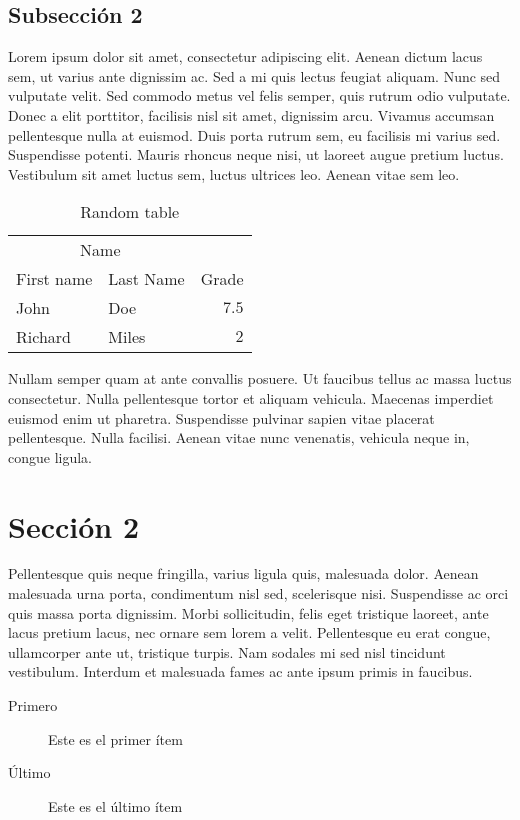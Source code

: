 \documentclass[DIV=calc,paper=a4,fontsize=11pt,twocolumn]{scrartcl} %
\begin{document}
\subsection*{Subsección 2}
Lorem ipsum dolor sit amet, consectetur adipiscing elit. Aenean dictum lacus sem, ut varius ante dignissim ac. Sed a mi quis lectus feugiat aliquam. Nunc sed vulputate velit. Sed commodo metus vel felis semper, quis rutrum odio vulputate. Donec a elit porttitor, facilisis nisl sit amet, dignissim arcu. Vivamus accumsan pellentesque nulla at euismod. Duis porta rutrum sem, eu facilisis mi varius sed. Suspendisse potenti. Mauris rhoncus neque nisi, ut laoreet augue pretium luctus. Vestibulum sit amet luctus sem, luctus ultrices leo. Aenean vitae sem leo.


\begin{table}
\caption{Random table}
\centering
\begin{tabular}{llr}
\toprule
\multicolumn{2}{c}{Name} \\
\cmidrule(r){1-2}
First name & Last Name & Grade \\
\midrule
John & Doe & $7.5$ \\
Richard & Miles & $2$ \\
\bottomrule
\end{tabular}
\end{table}

Nullam semper quam at ante convallis posuere. Ut faucibus tellus ac massa luctus consectetur. Nulla pellentesque tortor et aliquam vehicula. Maecenas imperdiet euismod enim ut pharetra. Suspendisse pulvinar sapien vitae placerat pellentesque. Nulla facilisi. Aenean vitae nunc venenatis, vehicula neque in, congue ligula.

\section*{Sección 2}
Pellentesque quis neque fringilla, varius ligula quis, malesuada dolor. Aenean malesuada urna porta, condimentum nisl sed, scelerisque nisi. Suspendisse ac orci quis massa porta dignissim. Morbi sollicitudin, felis eget tristique laoreet, ante lacus pretium lacus, nec ornare sem lorem a velit. Pellentesque eu erat congue, ullamcorper ante ut, tristique turpis. Nam sodales mi sed nisl tincidunt vestibulum. Interdum et malesuada fames ac ante ipsum primis in faucibus.


\begin{description}
\item[Primero] Este es el primer ítem
\item[Último] Este es el último ítem
\end{description}
\end{document}
